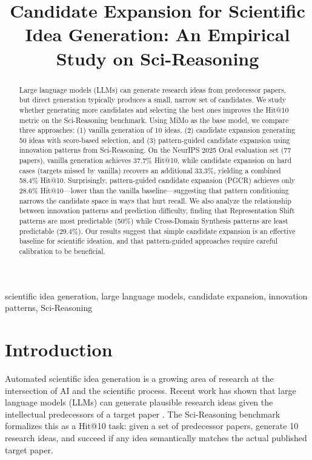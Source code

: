\documentclass[conference]{IEEEtran}
\begin{document}
\title{Candidate Expansion for Scientific Idea Generation: An Empirical Study on Sci-Reasoning}

\author{
}

\maketitle

\begin{abstract}
Large language models (LLMs) can generate research ideas from predecessor papers, but direct generation typically produces a small, narrow set of candidates. We study whether generating more candidates and selecting the best ones improves the Hit@10 metric on the Sci-Reasoning benchmark. Using MiMo as the base model, we compare three approaches: (1) vanilla generation of 10 ideas, (2) candidate expansion generating 50 ideas with score-based selection, and (3) pattern-guided candidate expansion using innovation patterns from Sci-Reasoning. On the NeurIPS 2025 Oral evaluation set (77 papers), vanilla generation achieves 37.7\% Hit@10, while candidate expansion on hard cases (targets missed by vanilla) recovers an additional 33.3\%, yielding a combined 58.4\% Hit@10. Surprisingly, pattern-guided candidate expansion (PGCR) achieves only 28.6\% Hit@10---lower than the vanilla baseline---suggesting that pattern conditioning narrows the candidate space in ways that hurt recall. We also analyze the relationship between innovation patterns and prediction difficulty, finding that Representation Shift patterns are most predictable (50\%) while Cross-Domain Synthesis patterns are least predictable (29.4\%). Our results suggest that simple candidate expansion is an effective baseline for scientific ideation, and that pattern-guided approaches require careful calibration to be beneficial.
\end{abstract}

\begin{IEEEkeywords}
scientific idea generation, large language models, candidate expansion, innovation patterns, Sci-Reasoning
\end{IEEEkeywords}

\section{Introduction}

Automated scientific idea generation is a growing area of research at the intersection of AI and the scientific process. Recent work has shown that large language models (LLMs) can generate plausible research ideas given the intellectual predecessors of a target paper \cite{liu2025scireasoning}. The Sci-Reasoning benchmark formalizes this as a Hit@10 task: given a set of predecessor papers, generate 10 research ideas, and succeed if any idea semantically matches the actual published target paper.
\end{document}
